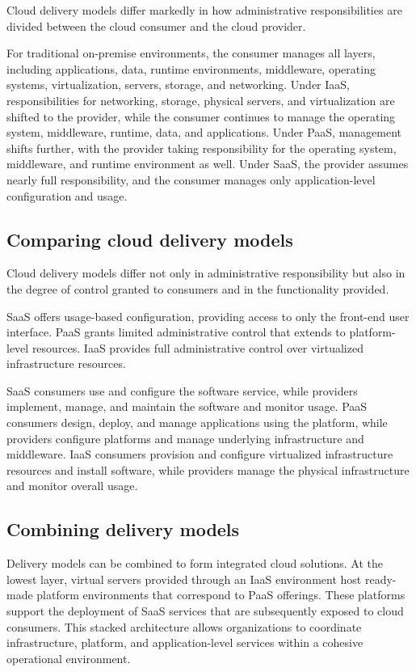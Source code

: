 \documentclass[11pt,a4paper,openany]{report}
\begin{document}
Cloud delivery models differ markedly in how administrative responsibilities are divided between the cloud consumer and the cloud provider.

For traditional on-premise environments, the consumer manages all layers, including applications, data, runtime environments, middleware, operating systems, virtualization, servers, storage, and networking. Under IaaS, responsibilities for networking, storage, physical servers, and virtualization are shifted to the provider, while the consumer continues to manage the operating system, middleware, runtime, data, and applications. Under PaaS, management shifts further, with the provider taking responsibility for the operating system, middleware, and runtime environment as well. Under SaaS, the provider assumes nearly full responsibility, and the consumer manages only application-level configuration and usage.

\subsection{Comparing cloud delivery models}

Cloud delivery models differ not only in administrative responsibility but also in the degree of control granted to consumers and in the functionality provided.

SaaS offers usage-based configuration, providing access to only the front-end user interface. PaaS grants limited administrative control that extends to platform-level resources. IaaS provides full administrative control over virtualized infrastructure resources.

SaaS consumers use and configure the software service, while providers implement, manage, and maintain the software and monitor usage. PaaS consumers design, deploy, and manage applications using the platform, while providers configure platforms and manage underlying infrastructure and middleware. IaaS consumers provision and configure virtualized infrastructure resources and install software, while providers manage the physical infrastructure and monitor overall usage.

\subsection{Combining delivery models}

Delivery models can be combined to form integrated cloud solutions. At the lowest layer, virtual servers provided through an IaaS environment host ready-made platform environments that correspond to PaaS offerings. These platforms support the deployment of SaaS services that are subsequently exposed to cloud consumers. This stacked architecture allows organizations to coordinate infrastructure, platform, and application-level services within a cohesive operational environment.
\end{document}
